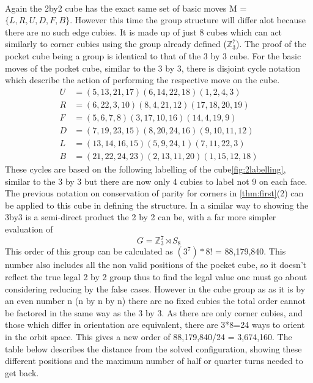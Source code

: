\documentclass{article}
\begin{document}
\paragraph*{}
Again the 2by2 cube has the exact same set of basic moves M = $\{L,R,U,D,F,B\}$. However this time the group structure will differ alot because there are no such edge cubies. It is made up of just 8 cubes which can act similarly to corner cubies using the group already defined ($\mathbb{Z}_{3}^{7}$). The proof of the pocket cube being a group is identical to that of the 3 by 3 cube.
For the basic moves of the pocket cube, similar to the 3 by 3, there is disjoint cycle notation which describe the action of performing the respective move on the cube. 
\begin{align*}
U&=(5,13,21,17)(6,14,22,18)(1,2,4,3)\\
R&=(6,22,3,10)(8,4,21,12)(17,18,20,19)\\
F&=(5,6,7,8)(3,17,10,16)(14,4,19,9)\\
D&=(7,19,23,15)(8,20,24,16)(9,10,11,12)\\
L&=(13,14,16,15)(5,9,24,1)(7,11,22,3)\\
B&= (21,22,24,23)(2,13,11,20)(1,15,12,18)
\end{align*}
These cycles are based on the following labelling of the cube\ref{fig:2labelling}, similar to the 3 by 3 but there are now only 4 cubies to label not 9 on each face. The previous notation on conservation of parity for corners in \ref{thm:first}(2) can be applied to this cube in defining the structure. In a similar way to showing the 3by3 is a semi-direct product the 2 by 2 can be, with a far more simpler evaluation of 
\begin{equation}
G = \mathbb{Z}^{7}_{3} \rtimes S_8
\end{equation}
This order of this group can be calculated as $(3^7)*8!$ = 88,179,840. This number also includes all the non valid positions of the pocket cube, so it doesn't reflect the true legal 2 by 2 group thus to find the legal value one must go about considering reducing by the false cases. However in the cube group as as it is by an even number n (n by n by n) there are no fixed cubies the total order cannot be factored in the same way as the 3 by 3. As there are only corner cubies, and those which differ in orientation are equivalent, there are 3*8=24 ways to orient in the orbit space. This gives a new order of 88,179,840/24 = 3,674,160.
The table below describes the distance from the solved configuration, showing these different positions and the maximum number of half or quarter turns needed to get back.
\end{document}
